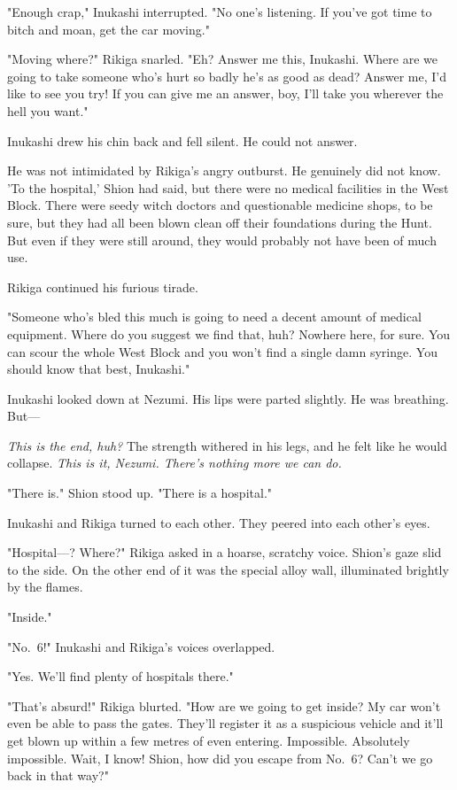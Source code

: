 "Enough crap," Inukashi interrupted. "No one's listening. If you've got
time to bitch and moan, get the car moving."

"Moving where?" Rikiga snarled. "Eh? Answer me this, Inukashi. Where are
we going to take someone who's hurt so badly he's as good as dead?
Answer me, I'd like to see you try! If you can give me an answer, boy,
I'll take you wherever the hell you want."

Inukashi drew his chin back and fell silent. He could not answer.

He was not intimidated by Rikiga's angry outburst. He genuinely did not
know. 'To the hospital,' Shion had said, but there were no medical
facilities in the West Block. There were seedy witch doctors and
questionable medicine shops, to be sure, but they had all been blown
clean off their foundations during the Hunt. But even if they were still
around, they would probably not have been of much use.

Rikiga continued his furious tirade.

"Someone who's bled this much is going to need a decent amount of
medical equipment. Where do you suggest we find that, huh? Nowhere here,
for sure. You can scour the whole West Block and you won't find a single
damn syringe. You should know that best, Inukashi."

Inukashi looked down at Nezumi. His lips were parted slightly. He was
breathing. But---

\emph{This is the end, huh?} The strength withered in his legs, and he felt
like he would collapse. \emph{This is it, Nezumi. There's nothing more we can
do.}

"There is." Shion stood up. "There is a hospital."

Inukashi and Rikiga turned to each other. They peered into each other's
eyes.

"Hospital---? Where?" Rikiga asked in a hoarse, scratchy voice. Shion's
gaze slid to the side. On the other end of it was the special alloy
wall, illuminated brightly by the flames.

"Inside."

"No.~6!" Inukashi and Rikiga's voices overlapped.

"Yes. We'll find plenty of hospitals there."

"That's absurd!" Rikiga blurted. "How are we going to get inside? My car
won't even be able to pass the gates. They'll register it as a
suspicious vehicle and it'll get blown up within a few metres of even
entering. Impossible. Absolutely impossible. Wait, I know! Shion, how
did you escape from No.~6? Can't we go back in that way?"

